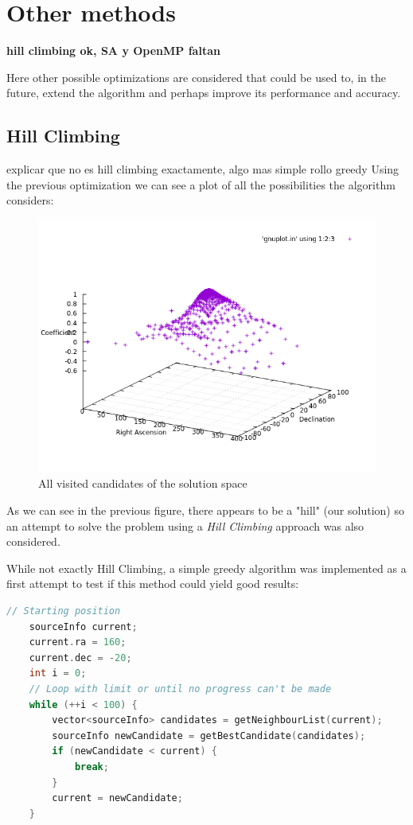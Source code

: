 \chapter{Other methods}

\textbf{hill climbing ok, SA y OpenMP faltan}

Here other possible optimizations are considered that could be used to, in the future, extend the algorithm and perhaps improve its performance and accuracy.

\section{Hill Climbing}

explicar que no es hill climbing exactamente, algo mas simple rollo greedy 
Using the previous optimization we can see a plot of all the possibilities the algorithm considers:

\begin{figure}[!htb]
	\begin{centering}
		\includegraphics[width=0.5\linewidth]{images/ch6/hillClimbing/resultsAll.png}
		\caption{All visited candidates of the solution space}
		\label{fig:solutionSpace}
	\end{centering}
\end{figure}

As we can see in the previous figure, there appears to be a "hill" (our solution) so an attempt to solve the problem using a \textit{Hill Climbing} approach was also considered.

While not exactly Hill Climbing, a simple greedy algorithm was implemented as a first attempt to test if this method could yield good results:

\begin{minipage}{\linewidth}
	\begin{lstlisting}[language=c, caption=Hill Climbing]
	// Starting position
	sourceInfo current;
	current.ra = 160;
	current.dec = -20;
	int i = 0;
	// Loop with limit or until no progress can't be made
	while (++i < 100) {
		vector<sourceInfo> candidates = getNeighbourList(current);
		sourceInfo newCandidate = getBestCandidate(candidates);
		if (newCandidate < current) {
			break;
		}
		current = newCandidate;
	}
	\end{lstlisting}
\end{minipage}

